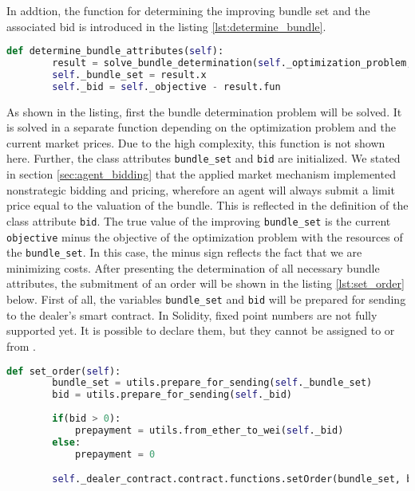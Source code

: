 In addtion, the function for determining the improving bundle set and the associated bid is introduced in the listing \ref{lst:determine_bundle}.

\begin{lstlisting}[label=lst:determine_bundle, caption=Determining of bundle attributes, language=Python]
    def determine_bundle_attributes(self):
        result = solve_bundle_determination(self._optimization_problem, self._mkt_prices)
        self._bundle_set = result.x
        self._bid = self._objective - result.fun
\end{lstlisting}

As shown in the listing, first the bundle determination problem will be solved.
It is solved in a separate function depending on the optimization problem and the current market prices.
Due to the high complexity, this function is not shown here. Further, the class attributes \verb|bundle_set| and \verb|bid| are initialized.
We stated in section \ref{sec:agent_bidding} that the applied market mechanism implemented nonstrategic bidding and pricing, wherefore 
an agent will always submit a limit price equal to the valuation of the bundle. 
This is reflected in the definition of the class attribute \verb|bid|. The true value of the improving \verb|bundle_set| 
is the current \verb|objective| minus the objective of the optimization problem with the resources of the \verb|bundle_set|.
In this case, the minus sign reflects the fact that we are minimizing costs.
After presenting the determination of all necessary bundle attributes, the submitment of an order will be shown in the listing \ref{lst:set_order} below.
First of all, the variables \verb|bundle_set| and \verb|bid| will be prepared for sending to the dealer's smart contract.
In Solidity, fixed point numbers are not fully supported yet. It is possible to declare them, but they cannot be assigned to or from .

\begin{lstlisting}[float=htbp, label=lst:set_order, caption=Submitment of order, language=Python]
    def set_order(self):
        bundle_set = utils.prepare_for_sending(self._bundle_set)
        bid = utils.prepare_for_sending(self._bid)
        
        if(bid > 0):
            prepayment = utils.from_ether_to_wei(self._bid)
        else:
            prepayment = 0

        self._dealer_contract.contract.functions.setOrder(bundle_set, bid, prepayment).transact({'from': self._account_address, 'value': prepayment})
\end{lstlisting}

